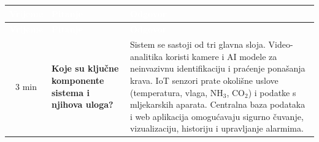 \documentclass{article}
\begin{document}
\vspace{0.5em}
\begin{xltabular}{\textwidth}{|c|L|L|}
\hline
{}
\textcolor{white}{\textbf{Vrijeme}} & 
\textcolor{white}{\textbf{Pitanje}} & 
\textcolor{white}{\textbf{Odgovor}} \\
\hline
\endfirsthead

\hline
{}
\textcolor{white}{\textbf{Vrijeme}} & 
\textcolor{white}{\textbf{Pitanje}} & 
\textcolor{white}{\textbf{Odgovor}} \\
\hline
\endhead

\hline
\endfoot

3 min &
\textbf{Koje su ključne komponente sistema i njihova uloga?} &
Sistem se sastoji od tri glavna sloja. Video-analitika koristi kamere i AI modele za neinvazivnu identifikaciju i praćenje ponašanja krava. IoT senzori prate okolišne uslove (temperatura, vlaga, NH$_3$, CO$_2$) i podatke s mljekarskih aparata. Centralna baza podataka i web aplikacija omogućavaju sigurno čuvanje, vizualizaciju, historiju i upravljanje alarmima.


\end{xltabular}
\end{document}
